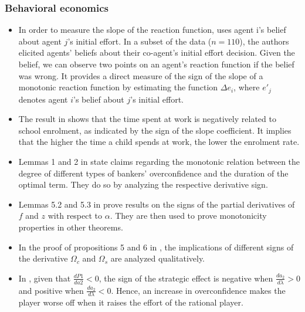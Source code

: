 \documentclass[11pt]{book}
\begin{document}
\subsubsection{Behavioral economics}
\begin{itemize}
\item In order to measure the slope of the reaction function, \cite{thoni2015peer}
uses agent i's belief about agent $j$'s initial effort. In a subset
of the data ($n=110$), the authors elicited agents' beliefs about
their co-agent's initial effort decision. Given the belief, we can
observe two points on an agent's reaction function if the belief was
wrong. It provides a direct measure of the sign of the slope of a
monotonic reaction function by estimating the function $\Delta e_{i}$,
where $e'_{j}$ denotes agent $i$'s belief about $j$'s initial effort.
\item The result in \cite{nwogwugwu2017impact}
shows that the time spent at work is negatively related to school
enrolment, as indicated by the sign of the slope coefficient. It implies
that the higher the time a child spends at work, the lower the enrolment
rate.
\item Lemmas 1 and 2 in \cite{farvaque2017optimal}
state claims regarding the monotonic relation between the degree of
different types of bankers' overconfidence and the duration of the
optimal term. They do so by analyzing the respective derivative sign.
\item Lemmas 5.2 and 5.3 in \cite{abebe2020opinion}
prove results on the signs of the partial derivatives of $f$ and
$z$ with respect to $\alpha$. They are then used to prove monotonicity
properties in other theorems.
\item In the proof of propositions 5 and 6 in \cite{marcoasocial},
the implications of different signs of the derivative $\Omega_{c}$
and $\Omega_{s}$ are analyzed qualitatively.
\item In \cite{santos2021overconfident},
given that $\frac{dP1}{da2}<0$, the sign of the strategic effect
is negative when $\frac{da_{2}}{d\lambda}>0$ and positive when $\frac{da_{2}}{d\lambda}<0$.
Hence, an increase in overconfidence makes the player worse off when
it raises the effort of the rational player.
\end{itemize}
\end{document}
